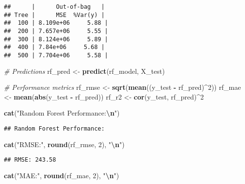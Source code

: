 \documentclass[
]{article}
\newenvironment{Shaded}{\begin{snugshade}}{\end{snugshade}}
\newcommand{\CommentTok}[1]{\textcolor[rgb]{0.56,0.35,0.01}{\textit{#1}}}
\newcommand{\DecValTok}[1]{\textcolor[rgb]{0.00,0.00,0.81}{#1}}
\newcommand{\FunctionTok}[1]{\textcolor[rgb]{0.13,0.29,0.53}{\textbf{#1}}}
\newcommand{\NormalTok}[1]{#1}
\newcommand{\OtherTok}[1]{\textcolor[rgb]{0.56,0.35,0.01}{#1}}
\newcommand{\SpecialCharTok}[1]{\textcolor[rgb]{0.81,0.36,0.00}{\textbf{#1}}}
\newcommand{\StringTok}[1]{\textcolor[rgb]{0.31,0.60,0.02}{#1}}
\begin{document}
\begin{verbatim}
##      |      Out-of-bag   |
## Tree |      MSE  %Var(y) |
##  100 | 8.109e+06     5.88 |
##  200 | 7.657e+06     5.55 |
##  300 | 8.124e+06     5.89 |
##  400 | 7.84e+06     5.68 |
##  500 | 7.704e+06     5.58 |
\end{verbatim}

\begin{Shaded}
\begin{Highlighting}[]
\CommentTok{\# Predictions}
\NormalTok{rf\_pred }\OtherTok{\textless{}{-}} \FunctionTok{predict}\NormalTok{(rf\_model, X\_test)}

\CommentTok{\# Performance metrics}
\NormalTok{rf\_rmse }\OtherTok{\textless{}{-}} \FunctionTok{sqrt}\NormalTok{(}\FunctionTok{mean}\NormalTok{((y\_test }\SpecialCharTok{{-}}\NormalTok{ rf\_pred)}\SpecialCharTok{\^{}}\DecValTok{2}\NormalTok{))}
\NormalTok{rf\_mae }\OtherTok{\textless{}{-}} \FunctionTok{mean}\NormalTok{(}\FunctionTok{abs}\NormalTok{(y\_test }\SpecialCharTok{{-}}\NormalTok{ rf\_pred))}
\NormalTok{rf\_r2 }\OtherTok{\textless{}{-}} \FunctionTok{cor}\NormalTok{(y\_test, rf\_pred)}\SpecialCharTok{\^{}}\DecValTok{2}

\FunctionTok{cat}\NormalTok{(}\StringTok{"Random Forest Performance:}\SpecialCharTok{\textbackslash{}n}\StringTok{"}\NormalTok{)}
\end{Highlighting}
\end{Shaded}

\begin{verbatim}
## Random Forest Performance:
\end{verbatim}

\begin{Shaded}
\begin{Highlighting}[]
\FunctionTok{cat}\NormalTok{(}\StringTok{"RMSE:"}\NormalTok{, }\FunctionTok{round}\NormalTok{(rf\_rmse, }\DecValTok{2}\NormalTok{), }\StringTok{"}\SpecialCharTok{\textbackslash{}n}\StringTok{"}\NormalTok{)}
\end{Highlighting}
\end{Shaded}

\begin{verbatim}
## RMSE: 243.58
\end{verbatim}

\begin{Shaded}
\begin{Highlighting}[]
\FunctionTok{cat}\NormalTok{(}\StringTok{"MAE:"}\NormalTok{, }\FunctionTok{round}\NormalTok{(rf\_mae, }\DecValTok{2}\NormalTok{), }\StringTok{"}\SpecialCharTok{\textbackslash{}n}\StringTok{"}\NormalTok{)}
\end{Highlighting}
\end{Shaded}
\end{document}
